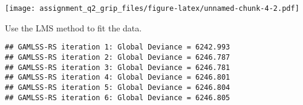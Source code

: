 \begin{Shaded}
\begin{Highlighting}[]
\SpecialCharTok{$}\SpecialCharTok{$}
      \NormalTok{,}
      \NormalTok{,}
      \NormalTok{,}
      \NormalTok{,}
      \NormalTok{)}

\NormalTok{(}\SpecialCharTok{$}\SpecialCharTok{$} \NormalTok{)}
\end{Highlighting}
\end{Shaded}

\texttt{[image: assignment\_q2\_grip\_files/figure-latex/unnamed-chunk-4-2.pdf]}

Use the LMS method to fit the data.

\begin{Shaded}
\begin{Highlighting}[]
\OtherTok{\textless{}{-}} \SpecialCharTok{\textasciitilde{}} 
                 \SpecialCharTok{\textasciitilde{}} 
                 \SpecialCharTok{\textasciitilde{}} 
\end{Highlighting}
\end{Shaded}

\begin{verbatim}
## GAMLSS-RS iteration 1: Global Deviance = 6242.993 
## GAMLSS-RS iteration 2: Global Deviance = 6246.787 
## GAMLSS-RS iteration 3: Global Deviance = 6246.781 
## GAMLSS-RS iteration 4: Global Deviance = 6246.801 
## GAMLSS-RS iteration 5: Global Deviance = 6246.804 
## GAMLSS-RS iteration 6: Global Deviance = 6246.805
\end{verbatim}

\begin{Shaded}
\begin{Highlighting}[]
\OtherTok{\textless{}{-}} 

\end{Highlighting}
\end{Shaded}

